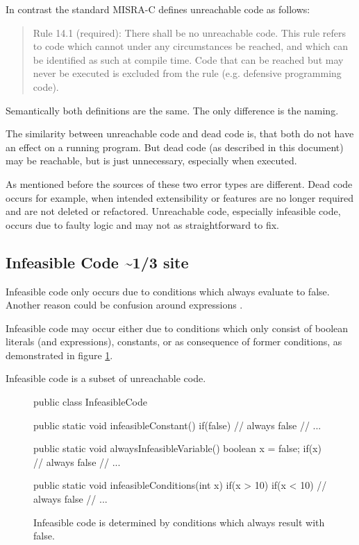 In contrast the standard MISRA-C \cite{motorindustrysoftwarereliabilityassociationMISRAC2004Guidelines2008} defines unreachable code as follows:
\begin{quote}
Rule 14.1 (required): There shall be no unreachable code.
This  rule  refers  to  code  which  cannot  under  any  circumstances  be  reached,  and  which  can  be 
identified as such at compile time. Code that can be reached but may never be executed is excluded 
from the rule (e.g. defensive programming code).	
\end{quote}
Semantically both definitions are the same. The only difference is the naming.


The similarity between unreachable code and dead code is, that both do not have an effect on a running program. But dead code (as described in this document) may be reachable, but is just unnecessary, especially when executed. 


As mentioned before the sources of these two error types are different.
Dead code occurs for example, when intended extensibility or features are no longer required and are not deleted or refactored.
Unreachable code, especially infeasible code, occurs due to faulty logic and may not as straightforward to fix.
\subsection{Infeasible Code \textasciitilde 1/3 site}
\label{sub:infeasible code}

Infeasible code only occurs due to conditions which always evaluate to false. Another reason could be confusion around expressions \cite{Eichberg_2015}.


Infeasible code may occur either due to conditions which only consist of boolean literals (and expressions), constants, or as consequence of former conditions, as demonstrated in figure \ref{code:infeasible code}.

Infeasible code is a subset of unreachable code.
\begin{figure}
	\begin{JavaCode}
public class InfeasibleCode {
	public static void infeasibleConstant() {
		if(false) {
			// always false
			// ...
		}
	}
			
	public static void alwaysInfeasibleVariable() {
		boolean x = false;
		if(x) {
			// always false
			// ...
		}
	}
			
	public static void infeasibleConditions(int x) {
		if(x > 10) {
			if(x < 10) {
				// always false
				// ...
			}
		}
	}
}\end{JavaCode}
	\caption{Infeasible code is determined by conditions which always result with false. }
	\label{code:infeasible code}
\end{figure}


